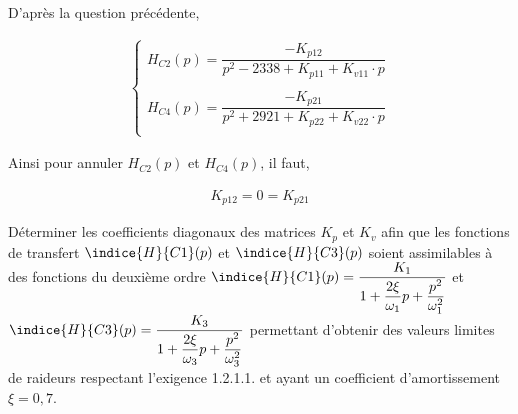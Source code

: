 \documentclass[11pt]{article}
\begin{document}
\begin{UPSTIcorrige}

D'après la question précédente,

\begin{align*}
\left\{
\begin{array}{l}
H_{C2}(p)=\dfrac{-K_{p12}}{p^2-2338+K_{p11}+K_{v11}\cdot p}\\
\\
H_{C4}(p)=\dfrac{-K_{p21}}{p^2+2921+K_{p22}+K_{v22}\cdot p}\\
\end{array}
\right.
\end{align*}

Ainsi pour annuler $H_{C2}(p)$ et $H_{C4}(p)$, il faut,

\begin{align*}
K_{p12}=0=K_{p21}
\end{align*}

\end{UPSTIcorrige}

\UPSTIquestion Déterminer les coefficients diagonaux des matrices $K_p$ et $K_v$ afin que les fonctions de transfert $\indice{H}{C1}(p)$ et $\indice{H}{C3}(p)$ soient assimilables à des fonctions du deuxième ordre $\indice{H}{C1}(p) = \dfrac{K_1}{1+\dfrac{2\xi}{\omega_1}p + \dfrac{p^2}{\omega_1^2}}$
et $\indice{H}{C3}(p) = \dfrac{K_3}{1+\dfrac{2\xi}{\omega_3}p + \dfrac{p^2}{\omega_3^2}}$ permettant d’obtenir des valeurs limites de raideurs respectant l’exigence 1.2.1.1. et ayant
un coefficient d’amortissement $\xi=0,7$.
\end{document}

